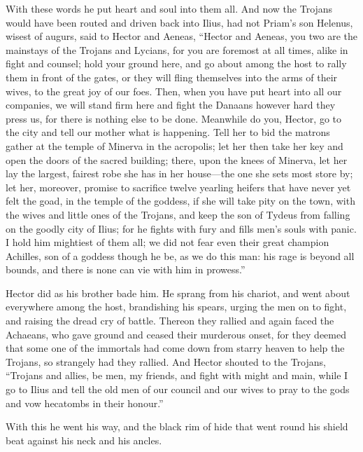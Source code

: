 With these words he put heart and soul into them all. And now the Trojans
would have been routed and driven back into Ilius, had not Priam’s son
Helenus, wisest of augurs, said to Hector and Aeneas, “Hector and Aeneas,
you two are the mainstays of the Trojans and Lycians, for you are foremost
at all times, alike in fight and counsel; hold your ground here, and go
about among the host to rally them in front of the gates, or they will
fling themselves into the arms of their wives, to the great joy of our
foes. Then, when you have put heart into all our companies, we will stand
firm here and fight the Danaans however hard they press us, for there is
nothing else to be done. Meanwhile do you, Hector, go to the city and tell
our mother what is happening. Tell her to bid the matrons gather at the
temple of Minerva in the acropolis; let her then take her key and open the
doors of the sacred building; there, upon the knees of Minerva, let her
lay the largest, fairest robe she has in her house—the one she sets
most store by; let her, moreover, promise to sacrifice twelve yearling
heifers that have never yet felt the goad, in the temple of the goddess,
if she will take pity on the town, with the wives and little ones of the
Trojans, and keep the son of Tydeus from falling on the goodly city of
Ilius; for he fights with fury and fills men’s souls with panic. I hold
him mightiest of them all; we did not fear even their great champion
Achilles, son of a goddess though he be, as we do this man: his rage is
beyond all bounds, and there is none can vie with him in prowess.”

Hector did as his brother bade him. He sprang from his chariot, and went
about everywhere among the host, brandishing his spears, urging the men on
to fight, and raising the dread cry of battle. Thereon they rallied and
again faced the Achaeans, who gave ground and ceased their murderous
onset, for they deemed that some one of the immortals had come down from
starry heaven to help the Trojans, so strangely had they rallied. And
Hector shouted to the Trojans, “Trojans and allies, be men, my friends,
and fight with might and main, while I go to Ilius and tell the old men of
our council and our wives to pray to the gods and vow hecatombs in their
honour.”

With this he went his way, and the black rim of hide that went round his
shield beat against his neck and his ancles.

